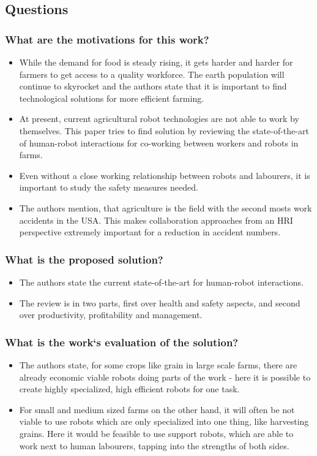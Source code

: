 \subsection*{Questions}
\subsubsection*{What are the motivations for this work?}
\begin{itemize}
    \item While the demand for food is steady rising, it gets harder and harder for farmers to get access to a quality workforce. The earth population will continue to skyrocket and the authors state that it is important to find technological solutions for more efficient farming.
    \item At present, current agricultural robot technologies are not able to work by themselves. This paper tries to find solution by reviewing the state-of-the-art of human-robot interactions for co-working between workers and robots in farms.
    \item Even without a close working relationship between robots and labourers, it is important to study the safety measures needed. 
    \item The authors mention, that agriculture is the field with the second mosts work accidents in the USA. This makes collaboration approaches from an HRI perspective extremely important for a reduction in accident numbers.
\end{itemize}
\subsubsection*{What is the proposed solution?}
\begin{itemize}
    \item The authors state the current state-of-the-art for human-robot interactions.
    \item The review is in two parts, first over health and safety aspects, and second over productivity, profitability and management.
\end{itemize}
\subsubsection*{What is the work`s evaluation of the solution?}
\begin{itemize}
    \item The authors state, for some crops like grain in large scale farms, there are already economic viable robots doing parts of the work - here it is possible to create highly specialized, high efficient robots for one task.
    \item For small and medium sized farms on the other hand, it will often be not viable to use robots which are only specialized into one thing, like harvesting grains. Here it would be feasible to use support robots, which are able to work next to human labourers, tapping into the strengths of both sides.
\end{itemize}
